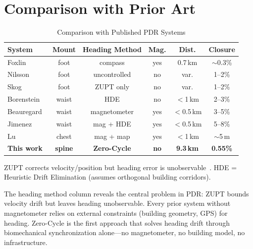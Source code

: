 \documentclass[11pt,a4paper]{article}
\begin{document}
\section{Comparison with Prior Art}
\label{sec:comparison}

\begin{table}[H]
\centering
\caption{Comparison with Published PDR Systems}
\label{tab:comparison}
\begin{tabular}{@{}lccccc@{}}
\toprule
System & Mount & Heading Method & Mag. & Dist. & Closure \\
\midrule
Foxlin~\cite{foxlin2005}         & foot  & compass         & yes & 0.7\,km    & $\sim$0.3\% \\
Nilsson~\cite{nilsson2012}       & foot  & uncontrolled    & no  & var.       & 1--2\% \\
Skog~\cite{skog2010}             & foot  & ZUPT only       & no  & var.       & 1--2\% \\
Borenstein~\cite{borenstein2010} & waist & HDE             & no  & $<$1\,km   & 2--3\% \\
Beauregard~\cite{beauregard2006} & waist & magnetometer    & yes & $<$0.5\,km & 3--5\% \\
Jimenez~\cite{jimenez2009}       & waist & mag + HDE       & yes & $<$0.5\,km & 5--8\% \\
Lu~\cite{lu2019}                 & chest & mag + map       & yes & $<$1\,km   & $\sim$5\,m \\
\textbf{This work}               & \textbf{spine} & \textbf{Zero-Cycle} & \textbf{no} & \textbf{9.3\,km} & \textbf{0.55\%} \\
\bottomrule
\end{tabular}

\vspace{2mm}
{\footnotesize ZUPT corrects velocity/position but heading error is
unobservable~\cite{nilsson2012}. HDE = Heuristic Drift Elimination (assumes
orthogonal building corridors).}
\end{table}

The heading method column reveals the central problem in PDR: ZUPT bounds
velocity drift but leaves heading unobservable. Every prior system without
magnetometer relies on external constraints (building geometry, GPS) for
heading. Zero-Cycle is the first approach that solves heading drift through
biomechanical synchronization alone---no magnetometer, no building model, no
infrastructure.
\end{document}
